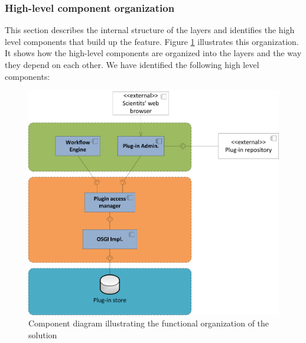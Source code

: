 \subsubsection{High-level component organization}

This section describes the internal structure of the layers and identifies the high level components that build up the feature. Figure \ref{fig_comp} illustrates this organization. It shows how the high-level components are organized into the layers and the way they depend on each other. We have identified the following high level components:

\begin{figure}[h!]
  \centering
  	\includegraphics[scale=0.6]{plug-in/layers/main-func.png}
  \caption{Component diagram illustrating the functional organization of the solution}
  \label{fig_comp}
\end{figure}

